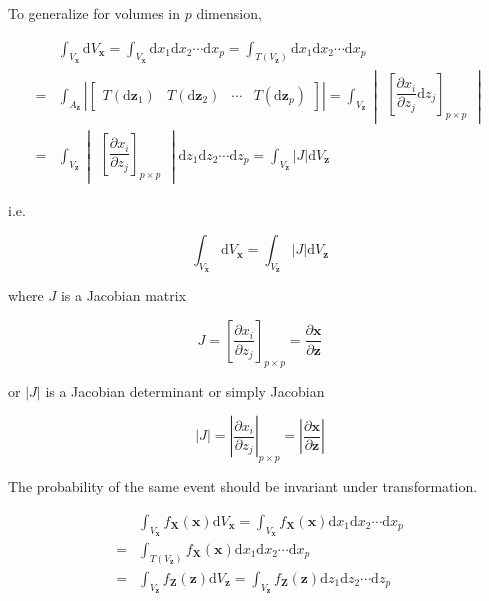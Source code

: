 \documentclass[
]{book}
\theoremstyle{definition}
\theoremstyle{definition}
\theoremstyle{definition}
\theoremstyle{definition}
\theoremstyle{remark}
\begin{document}
To generalize for volumes in \(p\) dimension,

\[
\begin{aligned}
 & \int_{V_{\boldsymbol{x}}}\mathrm{d}V_{\boldsymbol{x}}=\int_{V_{\boldsymbol{x}}}\mathrm{d}x_{1}\mathrm{d}x_{2}\cdots\mathrm{d}x_{p}=\int_{T\left(V_{\boldsymbol{z}}\right)}\mathrm{d}x_{1}\mathrm{d}x_{2}\cdots\mathrm{d}x_{p}\\
= & \int_{A_{\boldsymbol{z}}}\left|\begin{bmatrix}T\left(\mathrm{d}\boldsymbol{z}_{1}\right) & T\left(\mathrm{d}\boldsymbol{z}_{2}\right) & \cdots & T\left(\mathrm{d}\boldsymbol{z}_{p}\right)\end{bmatrix}\right|=\int_{V_{\boldsymbol{z}}}\begin{vmatrix}\left[\dfrac{\partial x_{i}}{\partial z_{j}}\mathrm{d}z_{j}\right]_{p\times p}\end{vmatrix}\\
= & \int_{V_{\boldsymbol{z}}}\begin{vmatrix}\left[\dfrac{\partial x_{i}}{\partial z_{j}}\right]_{p\times p}\end{vmatrix}\mathrm{d}z_{1}\mathrm{d}z_{2}\cdots\mathrm{d}z_{p}=\int_{V_{\boldsymbol{z}}}\left|J\right|\mathrm{d}V_{\boldsymbol{z}}
\end{aligned}
\]

i.e.

\begin{equation}
\label{eq:mitj}
\int_{V_{\boldsymbol{x}}}\mathrm{d}V_{\boldsymbol{x}}=\int_{V_{\boldsymbol{z}}}\left|J\right|\mathrm{d}V_{\boldsymbol{z}}
\end{equation}

where \(J\) is a Jacobian matrix

\[
J=\left[\dfrac{\partial x_{i}}{\partial z_{j}}\right]_{p\times p}=\dfrac{\partial\boldsymbol{x}}{\partial\boldsymbol{z}}
\]

or \(\left|J\right|\) is a Jacobian determinant or simply Jacobian

\[
\left|J\right|=\left|\dfrac{\partial x_{i}}{\partial z_{j}}\right|_{p\times p}=\left|\dfrac{\partial\boldsymbol{x}}{\partial\boldsymbol{z}}\right|
\]

The probability of the same event should be invariant under transformation.

\[
\begin{aligned}
 & \int_{V_{\boldsymbol{x}}}f_{\boldsymbol{X}}\left(\boldsymbol{x}\right)\mathrm{d}V_{\boldsymbol{x}}=\int_{V_{\boldsymbol{x}}}f_{\boldsymbol{X}}\left(\boldsymbol{x}\right)\mathrm{d}x_{1}\mathrm{d}x_{2}\cdots\mathrm{d}x_{p}\\
= & \int_{T\left(V_{\boldsymbol{z}}\right)}f_{\boldsymbol{X}}\left(\boldsymbol{x}\right)\mathrm{d}x_{1}\mathrm{d}x_{2}\cdots\mathrm{d}x_{p}\\
= & \int_{V_{\boldsymbol{z}}}f_{\boldsymbol{Z}}\left(\boldsymbol{z}\right)\mathrm{d}V_{\boldsymbol{z}}=\int_{V_{\boldsymbol{z}}}f_{\boldsymbol{Z}}\left(\boldsymbol{z}\right)\mathrm{d}z_{1}\mathrm{d}z_{2}\cdots\mathrm{d}z_{p}
\end{aligned}
\]
\end{document}

